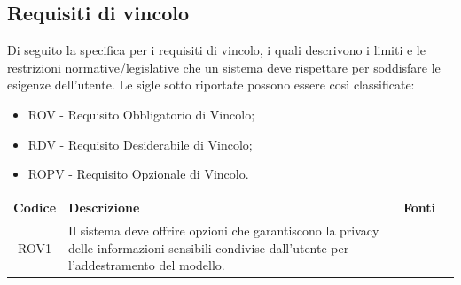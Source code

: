 \documentclass[10pt, a4paper]{article}
\begin{document}
\subsection{Requisiti di vincolo}
Di seguito la specifica per i requisiti di vincolo, i quali descrivono i limiti e le restrizioni normative/legislative che un sistema
deve rispettare per soddisfare le esigenze dell'utente.
Le sigle sotto riportate possono essere così classificate:
\begin{itemize}
    \item ROV - Requisito Obbligatorio di Vincolo;
    \item RDV - Requisito Desiderabile di Vincolo;
    \item ROPV - Requisito Opzionale di Vincolo. 
\end{itemize}
\renewcommand{\arraystretch}{1.5}
\begin{tabularx}{\textwidth}{|c|X|c|c}\hline
\textbf{Codice} & \textbf{Descrizione} & \textbf{Fonti} \\
\hline
ROV1 & Il sistema deve offrire opzioni che garantiscono la privacy delle informazioni sensibili condivise dall'utente per l'addestramento del modello. & - \\
\hline

\end{tabularx}
\end{document}
